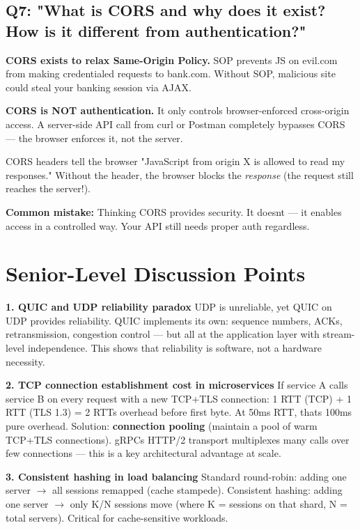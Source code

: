 \documentclass[11pt]{article}
\begin{document}
\subsection{Q7: "What is CORS and why does it exist? How is it different from authentication?"}\label{q7-what-is-cors-and-why-does-it-exist-how-is-it-different-from-authentication}

\textbf{CORS exists to relax Same-Origin Policy.} SOP prevents JS on evil.com from making credentialed requests to bank.com. Without SOP, malicious site could steal your banking session via AJAX.

\textbf{CORS is NOT authentication.} It only controls browser-enforced cross-origin access. A server-side API call from curl or Postman completely bypasses CORS --- the browser enforces it, not the server.

CORS headers tell the browser "JavaScript from origin X is allowed to read my responses." Without the header, the browser blocks the \emph{response} (the request still reaches the server!).

\textbf{Common mistake:} Thinking CORS provides security. It doesn\textquotesingle t --- it enables access in a controlled way. Your API still needs proper auth regardless.

\section{Senior-Level Discussion Points}\label{senior-level-discussion-points}

\textbf{1. QUIC and UDP reliability paradox}
UDP is unreliable, yet QUIC on UDP provides reliability. QUIC implements its own: sequence numbers, ACKs, retransmission, congestion control --- but all at the application layer with stream-level independence. This shows that reliability is software, not a hardware necessity.

\textbf{2. TCP connection establishment cost in microservices}
If service A calls service B on every request with a new TCP+TLS connection: 1 RTT (TCP) + 1 RTT (TLS 1.3) = 2 RTTs overhead before first byte. At 50ms RTT, that\textquotesingle s 100ms pure overhead. Solution: \textbf{connection pooling} (maintain a pool of warm TCP+TLS connections). gRPC\textquotesingle s HTTP/2 transport multiplexes many calls over few connections --- this is a key architectural advantage at scale.

\textbf{3. Consistent hashing in load balancing}
Standard round-robin: adding one server \(\rightarrow\) all sessions remapped (cache stampede). Consistent hashing: adding one server \(\rightarrow\) only K/N sessions move (where K = sessions on that shard, N = total servers). Critical for cache-sensitive workloads.
\end{document}
